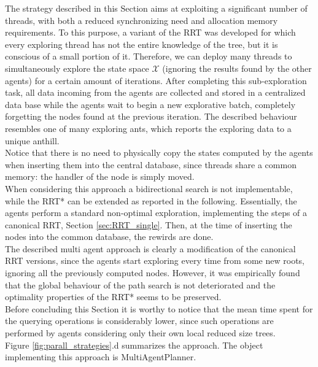 The strategy described in this Section aims at exploiting a significant number of threads, with both a reduced synchronizing need and allocation memory requirements. To this purpose, a variant of the RRT was developed for which every exploring thread has not the entire knowledge of the tree, but it is conscious of a small portion of it. 
Therefore, we can deploy many threads to simultaneously explore the state space $\mathcal{X}$ (ignoring the results found by the other agents) for
a certain amount of iterations. After completing this sub-exploration task, all data incoming from the agents are collected and stored in a centralized data base while the agents wait to begin a new explorative batch, completely forgetting the nodes found at the previous iteration. 
The described behaviour resembles one of many exploring ants, which reports the exploring data to a unique anthill.
\\
Notice that there is no need to physically copy the states computed by the agents when inserting them into the central database, since threads share a common memory: the handler of the node is simply moved. 
\\
When considering this approach a bidirectional search is not implementable, while the RRT* can be extended as reported in the following.
Essentially, the agents perform a standard non-optimal exploration, implementing the steps of a canonical RRT, Section \ref{sec:RRT_single}.
Then, at the time of inserting the nodes into the common database, the rewirds are done.
\\
The described multi agent approach is clearly a modification of the canonical RRT versions, since the agents start exploring every time from some new roots, ignoring all the previously computed nodes. However, it was empirically found that the global behaviour of the path search is not deteriorated and the optimality properties of the RRT* seems to be preserved.
\\
Before concluding this Section it is worthy to notice that the mean time spent for the querying operations is considerably
lower, since such operations are performed by agents considering only their own local reduced size trees.
\\
Figure \ref{fig:parall_strategies}.d summarizes the approach.
The object implementing this approach is MultiAgentPlanner.
